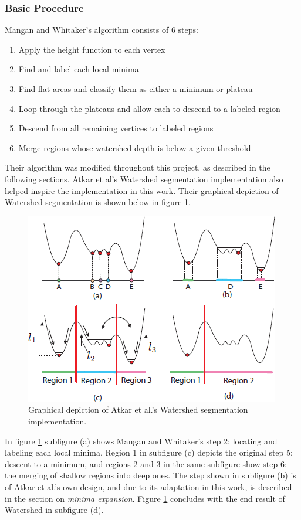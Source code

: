 \subsubsection{Basic Procedure}
Mangan and Whitaker's algorithm consists of 6 steps:
\begin{enumerate}
	\item Apply the height function to each vertex
	\item Find and label each local minima
	\item Find flat areas and classify them as either a minimum or plateau
	\item \label{plateau_step} Loop through the plateaus and allow each to descend to a labeled region
	\item Descend from all remaining vertices to labeled regions
	\item Merge regions whose watershed depth is below a given threshold
\end{enumerate}

Their algorithm was modified throughout this project, as described in the following sections.
Atkar et al's Watershed segmentation implementation also helped inspire the implementation in this work\cite{HierSurfSeg_for_autobody_painting}.
Their graphical depiction of Watershed segmentation is shown below in figure \ref{fig:ws_1570179_steps}.
\begin{figure}[htb]
	\centering
	\includegraphics[width=0.5\linewidth]{../resources/watershed/1570179_WS_steps.png}
\caption{
Graphical depiction of Atkar et al.'s Watershed segmentation implementation.\cite{HierSurfSeg_for_autobody_painting}
}
	\label{fig:ws_1570179_steps}
\end{figure}

In figure \ref{fig:ws_1570179_steps} subfigure (a) shows Mangan and Whitaker's step 2: locating and labeling each local minima.
Region 1 in subfigure (c) depicts the original step 5: descent to a minimum, and regions 2 and 3 in the same subfigure show step 6: the merging of shallow regions into deep ones.
The step shown in subfigure (b) is of Atkar et al.'s own design, and due to its adaptation in this work, is described in the section on \textit{minima expansion}.
Figure \ref{fig:ws_1570179_steps} concludes with the end result of Watershed in subfigure (d).

